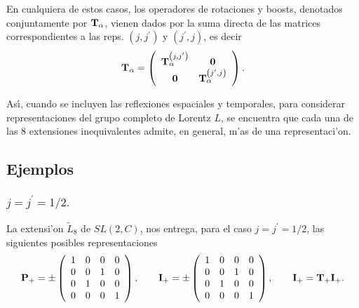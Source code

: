 En cualquiera de estos casos, los operadores de rotaciones y boosts,
denotados conjuntamente por ${\bf T}_{\alpha }$, vienen dados por la suma
directa de las matrices correspondientes a las reps. $\left( j,j^{\prime
}\right) $ y $\left( j^{\prime },j\right) $, es decir 
\begin{equation}
{\bf T}_{\alpha }=\left( 
\begin{array}{cc}
{\bf T}_{\alpha }^{\left( j,j^{\prime }\right) } & {\bf 0} \\ 
{\bf 0} & {\bf T}_{\alpha }^{\left( j^{\prime },j\right) }
\end{array}
\right) . 
\end{equation}

As{\'\i}, cuando se incluyen las reflexiones espaciales y temporales, para
considerar representaciones del grupo completo de Lorentz $L$, se encuentra
que cada una de las 8 extensiones inequivalentes admite, en general, m'as
de una representaci'on.

\subsection{Ejemplos}

\subsubsection{$j=j^{\prime }={1}/{2}.$}

La extensi'on $\widetilde{L}_{8}$ de $SL(2,C)$, nos entrega, para el caso 
$j=j^{\prime }={1}/{2}$, las siguientes posibles representaciones 
\begin{equation}
{\bf P}_{+}=\pm \left( 
\begin{array}{cccc}
1 & 0 & 0 & 0 \\ 
0 & 0 & 1 & 0 \\ 
0 & 1 & 0 & 0 \\ 
0 & 0 & 0 & 1
\end{array}
\right) ,\qquad {\bf I}_{+}=\pm \left( 
\begin{array}{cccc}
1 & 0 & 0 & 0 \\ 
0 & 0 & 1 & 0 \\ 
0 & 1 & 0 & 0 \\ 
0 & 0 & 0 & 1
\end{array}
\right) ,\qquad {\bf I}_{+}={\bf T}_{+}{\bf I}_{+}. 
\end{equation}

